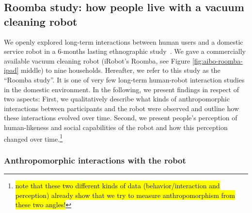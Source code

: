 \documentclass{frontiersSCNS} %
\begin{document}
\subsection{Roomba study: how people live with a vacuum cleaning robot}

We openly explored long-term interactions between human users and a domestic
service robot in a 6-months lasting ethnographic study~\citep{fink_living_2013}. 
We gave a commercially
available vacuum cleaning robot (iRobot's Roomba, see Figure
\ref{fig:aibo-roomba-ipad} middle) to nine households. 
Hereafter, we refer to this study as the ``Roomba study''. It is one of very few 
long-term human-robot interaction studies in the domestic environment. 
In the following, we present findings in respect of two aspects: First, we
qualitatively describe what kinds of anthropomorphic interactions between
participants and the robot were observed and outline how these interactions
evolved over time.  Second, we present people's perception of human-likeness and
social capabilities of the robot and how this perception changed over
time.\footnote{\hl{note that these two different kinds of data
(behavior/interaction and perception) already show that we try to measure
anthropomorphism from these two angles!}}



\subsubsection{Anthropomorphic interactions with the robot\\}
\end{document}
